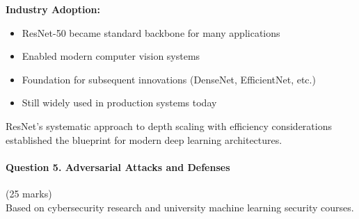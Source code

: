 \documentclass[12pt]{article}
\begin{document}
\begin{enumerate}[(a)]
{    \textbf{Industry Adoption:}
    \begin{itemize}
        \item ResNet-50 became standard backbone for many applications
        \item Enabled modern computer vision systems
        \item Foundation for subsequent innovations (DenseNet, EfficientNet, etc.)
        \item Still widely used in production systems today
    \end{itemize}
    
    ResNet's systematic approach to depth scaling with efficiency considerations established the blueprint for modern deep learning architectures.
    }
\end{enumerate}

\newpage
\paragraph{Question 5. Adversarial Attacks and Defenses}{\hfill (25 marks)}\\
Based on cybersecurity research and university machine learning security courses.
\end{document}
